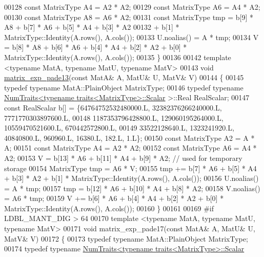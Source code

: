 \begin{DoxyCode}
00128   \textcolor{keyword}{const} MatrixType A4 = A2 * A2;
00129   \textcolor{keyword}{const} MatrixType A6 = A4 * A2;
00130   \textcolor{keyword}{const} MatrixType A8 = A6 * A2;
00131   \textcolor{keyword}{const} MatrixType tmp = b[9] * A8 + b[7] * A6 + b[5] * A4 + b[3] * A2 
00132     + b[1] * MatrixType::Identity(A.rows(), A.cols());
00133   U.noalias() = A * tmp;
00134   V = b[8] * A8 + b[6] * A6 + b[4] * A4 + b[2] * A2 + b[0] * MatrixType::Identity(A.rows(), A.cols());
00135 \}
00136 
00142 \textcolor{keyword}{template} <\textcolor{keyword}{typename} MatA, \textcolor{keyword}{typename} MatU, \textcolor{keyword}{typename} MatV>
00143 \textcolor{keywordtype}{void} \hyperlink{namespace_eigen_1_1internal_ae7d0962a143c96343984440db683905a}{matrix\_exp\_pade13}(\textcolor{keyword}{const} MatA& A, MatU& U, MatV& V)
00144 \{
00145   \textcolor{keyword}{typedef} \textcolor{keyword}{typename} MatA::PlainObject MatrixType;
00146   \textcolor{keyword}{typedef} \textcolor{keyword}{typename} \hyperlink{group___core___module_struct_eigen_1_1_num_traits}{NumTraits<typename traits<MatrixType>::Scalar}
      >::Real RealScalar;
00147   \textcolor{keyword}{const} RealScalar b[] = \{64764752532480000.L, 32382376266240000.L, 7771770303897600.L,
00148                           1187353796428800.L, 129060195264000.L, 10559470521600.L, 670442572800.L,
00149                           33522128640.L, 1323241920.L, 40840800.L, 960960.L, 16380.L, 182.L, 1.L\};
00150   \textcolor{keyword}{const} MatrixType A2 = A * A;
00151   \textcolor{keyword}{const} MatrixType A4 = A2 * A2;
00152   \textcolor{keyword}{const} MatrixType A6 = A4 * A2;
00153   V = b[13] * A6 + b[11] * A4 + b[9] * A2; \textcolor{comment}{// used for temporary storage}
00154   MatrixType tmp = A6 * V;
00155   tmp += b[7] * A6 + b[5] * A4 + b[3] * A2 + b[1] * MatrixType::Identity(A.rows(), A.cols());
00156   U.noalias() = A * tmp;
00157   tmp = b[12] * A6 + b[10] * A4 + b[8] * A2;
00158   V.noalias() = A6 * tmp;
00159   V += b[6] * A6 + b[4] * A4 + b[2] * A2 + b[0] * MatrixType::Identity(A.rows(), A.cols());
00160 \}
00161 
00169 \textcolor{preprocessor}{#if LDBL\_MANT\_DIG > 64}
00170 \textcolor{keyword}{template} <\textcolor{keyword}{typename} MatA, \textcolor{keyword}{typename} MatU, \textcolor{keyword}{typename} MatV>
00171 \textcolor{keywordtype}{void} matrix\_exp\_pade17(\textcolor{keyword}{const} MatA& A, MatU& U, MatV& V)
00172 \{
00173   \textcolor{keyword}{typedef} \textcolor{keyword}{typename} MatA::PlainObject MatrixType;
00174   \textcolor{keyword}{typedef} \textcolor{keyword}{typename} \hyperlink{group___core___module_struct_eigen_1_1_num_traits}{NumTraits<typename traits<MatrixType>::Scalar}

\end{DoxyCode}
